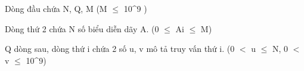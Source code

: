 Dòng đầu chứa N, Q, M (M  $\le$  10^9 )

Dòng thứ 2 chứa N số biểu diễn dãy A. (0  $\le$  Ai  $\le$  M)

Q dòng sau, dòng thứ i chứa 2 số u, v mô tả truy vấn thứ i. (0 $<$ u  $\le$  N, 0 $<$ v  $\le$  10^9)

\